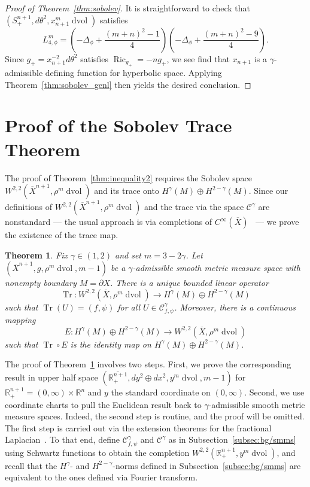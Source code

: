 \documentclass{amsart}
\newtheorem{thm}{Theorem}[section]
\theoremstyle{definition}
\theoremstyle{remark}
\numberwithin{equation}{section}
\begin{document}
\begin{proof}[Proof of Theorem~\ref{thm:sobolev}]
 It is straightforward to check that $(S_+^{n+1},d\theta^2,x_{n+1}^m\operatorname{dvol})$ satisfies
 \[ L_{4,\phi}^m = \left(-\Delta_\phi + \frac{(m+n)^2-1}{4}\right)\left(-\Delta_\phi + \frac{(m+n)^2-9}{4}\right) . \]
 Since $g_+=x_{n+1}^{-2}d\theta^2$ satisfies $\operatorname{Ric}_{g_+}=-ng_+$, we see find that $x_{n+1}$ is a $\gamma$-admissible defining function for hyperbolic space.  Applying Theorem~\ref{thm:sobolev_genl} then yields the desired conclusion.
\end{proof}

\appendix

\section{Proof of the Sobolev Trace Theorem}
\label{sec:appendix}

The proof of Theorem~\ref{thm:inequality2} requires the Sobolev space $W^{2,2}({\overline{X}}^{n+1},\rho^m\operatorname{dvol})$ and its trace onto $H^\gamma(M)\oplus H^{2-\gamma}(M)$.  Since our definitions of $W^{2,2}({\overline{X}}^{n+1},\rho^m\operatorname{dvol})$ and the trace via the space ${\mathcal{C}}^\gamma$ are nonstandard --- the usual approach is via completions of $C^\infty({\overline{X}})$~\cite{Triebel1978} --- we prove the existence of the trace map.

\begin{thm}
 \label{thm:trace}
 Fix $\gamma\in(1,2)$ and set $m=3-2\gamma$.  Let $({\overline{X}}^{n+1},g,\rho^m\operatorname{dvol},m-1)$ be a $\gamma$-admissible smooth metric measure space with nonempty boundary $M=\partial X$.  There is a unique bounded linear operator
 \[ \operatorname{Tr}\colon W^{2,2}({\overline{X}},\rho^m\operatorname{dvol}) \to H^\gamma(M) \oplus H^{2-\gamma}(M) \]
 such that $\operatorname{Tr}(U)=(f,\psi)$ for all $U\in{\mathcal{C}}_{f,\psi}^\gamma$.  Moreover, there is a continuous mapping
 \[ E \colon H^\gamma(M) \oplus H^{2-\gamma}(M) \to W^{2,2}({\overline{X}},\rho^m\operatorname{dvol}) \]
 such that $\operatorname{Tr}\circ E$ is the identity map on $H^\gamma(M)\oplus H^{2-\gamma}(M)$.
\end{thm}

The proof of Theorem~\ref{thm:trace} involves two steps.  First, we prove the corresponding result in upper half space $(\overline{{\mathbb{R}}_+^{n+1}},dy^2\oplus dx^2,y^m\operatorname{dvol},m-1)$ for ${\mathbb{R}}_+^{n+1}=(0,\infty)\times{\mathbb{R}}^n$ and $y$ the standard coordinate on $(0,\infty)$.  Second, we use coordinate charts to pull the Euclidean result back to $\gamma$-admissible smooth metric measure spaces.  Indeed, the second step is routine, and the proof will be omitted.  The first step is carried out via the extension theorems for the fractional Laplacian~\cite{CaffarelliSilvestre2007,Yang2013}.  To that end, define ${\mathcal{C}}_{f,\psi}^\gamma$ and ${\mathcal{C}}^\gamma$ as in Subsection~\ref{subsec:bg/smms} using Schwartz functions to obtain the completion $W^{2,2}({\mathbb{R}}_+^{n+1},y^m\operatorname{dvol})$, and recall that the $H^\gamma$- and $H^{2-\gamma}$-norms defined in Subsection~\ref{subsec:bg/smms} are equivalent to the ones defined via Fourier transform.
\end{document}
